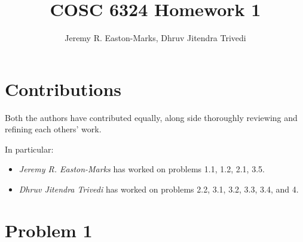 \documentclass[11pt]{article}
\date{}
\begin{document}
\title{ COSC 6324 Homework 1}
\author{Jeremy R. Easton-Marks, Dhruv Jitendra Trivedi \\
 }

 \maketitle

\section*{Contributions}
Both the authors have contributed equally, along side thoroughly reviewing and refining each others' work.

In particular:
\begin{itemize}
    \item \emph{Jeremy R. Easton-Marks} has worked on problems 1.1, 1.2, 2.1, 3.5.
    \item \emph{Dhruv Jitendra Trivedi} has worked on problems 2.2, 3.1, 3.2, 3.3, 3.4, and 4.
\end{itemize}

\section*{Problem 1}
\end{document}
